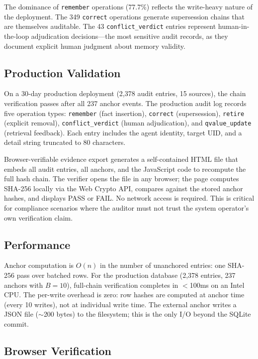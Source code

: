 \documentclass[sigconf,nonacm]{acmart}
\begin{document}
The dominance of \texttt{remember} operations (77.7\%) reflects the write-heavy nature of the deployment. The 349 \texttt{correct} operations generate supersession chains that are themselves auditable. The 43 \texttt{conflict\_verdict} entries represent human-in-the-loop adjudication decisions---the most sensitive audit records, as they document explicit human judgment about memory validity.

\subsection{Production Validation}
On a 30-day production deployment (2,378 audit entries, 15 sources), the chain verification passes after all 237 anchor events. The production audit log records five operation types: \texttt{remember} (fact insertion), \texttt{correct} (supersession), \texttt{retire} (explicit removal), \texttt{conflict\_verdict} (human adjudication), and \texttt{qvalue\_update} (retrieval feedback). Each entry includes the agent identity, target UID, and a detail string truncated to 80 characters.

Browser-verifiable evidence export generates a self-contained HTML file that embeds all audit entries, all anchors, and the JavaScript code to recompute the full hash chain. The verifier opens the file in any browser; the page computes SHA-256 locally via the Web Crypto API, compares against the stored anchor hashes, and displays PASS or FAIL. No network access is required. This is critical for compliance scenarios where the auditor must not trust the system operator's own verification claim.

\subsection{Performance}

Anchor computation is $O(n)$ in the number of unanchored entries: one SHA-256 pass over batched rows. For the production database (2,378 entries, 237 anchors with $B=10$), full-chain verification completes in $<$100ms on an Intel CPU. The per-write overhead is zero: row hashes are computed at anchor time (every 10 writes), not at individual write time. The external anchor writes a JSON file ($\sim$200 bytes) to the filesystem; this is the only I/O beyond the SQLite commit.

\subsection{Browser Verification}
\end{document}
